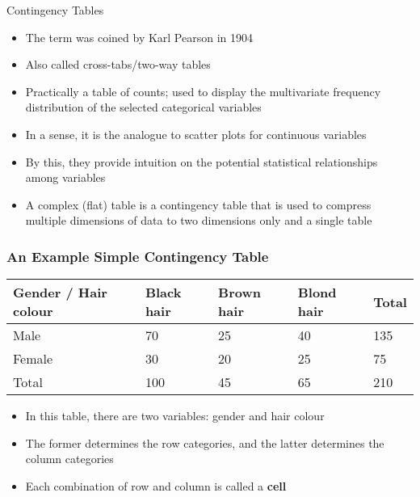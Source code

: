 \documentclass[10pt]{beamer}
\theoremstyle{definition}
\begin{document}
\begin{frame}[fragile]{Contingency Tables}
\begin{itemize}
	\item The term was coined by Karl Pearson in 1904
	
	\item Also called cross-tabs/two-way tables
	
	\item Practically a table of counts; used to display the multivariate frequency distribution of the selected categorical variables
	
	\item In a sense, it is the analogue to scatter plots for continuous variables
	
	\item By this, they provide intuition on the potential statistical relationships among variables
	
	\item A complex (flat) table is a contingency table that is used to compress multiple dimensions of data to two dimensions only and a single table
\end{itemize}

\end{frame}
\begin{frame}[fragile]
\frametitle{An Example Simple Contingency Table}
\begin{longtable}[]{@{}lllll@{}}
\toprule
Gender / Hair colour & Black hair & Brown hair & Blond hair & Total\tabularnewline
\midrule
\endhead
Male & 70 & 25 & 40 & 135\tabularnewline
Female & 30 & 20 & 25 & 75\tabularnewline
Total & 100 & 45 & 65 & 210\tabularnewline
\bottomrule
\end{longtable}

\begin{itemize}
	\item In this table, there are two variables: gender and hair colour
	
	\item The former determines the row categories, and the latter determines the column categories
	
	\item Each combination of row and column is called a \textbf{cell}
\end{itemize}
\end{frame}
\end{document}
